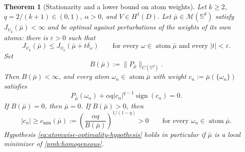 \documentclass[11pt]{amsart}
\newtheorem{theorem}{Theorem}[section]
\theoremstyle{definition}
\theoremstyle{remark}
\DeclareMathOperator{\atom}{atom}
\DeclareMathOperator{\sign}{sign}
\begin{document}
\begin{theorem}[Stationarity and a lower bound on atom weights]
\label{thm:homogeneous_optimality}
Let $k\ge2$, $q=2/(k+1)\in(0,1)$, $\alpha>0$, and $V\in H^1(D)$. Let
$\bar\mu\in\mathcal M(\mathbb S^d)$ satisfy $J_{\psi_k}(\bar\mu)<\infty$ and
be optimal against perturbations of the weights of its own atoms: there is
$\varepsilon>0$ such that
\begin{equation}
\label{eq:atomwise-optimality-hypothesis}
	J_{\psi_k}(\bar\mu)\le J_{\psi_k}(\bar\mu+t\delta_{\omega})
	\qquad\text{for every }\omega\in\atom\bar\mu
	\text{ and every }|t|<\varepsilon.
\end{equation}
Set
\begin{equation*}
	B(\bar\mu):=\|P_{\bar\mu}\|_{C(\mathbb S^d)}.
\end{equation*}
Then $B(\bar\mu)<\infty$, and every atom
$\omega_n\in\atom\bar\mu$ with weight $c_n:=\bar\mu(\{\omega_n\})$ satisfies
\begin{equation}
\label{eq:homogeneous-stationarity}
	P_{\bar\mu}(\omega_n)
	+\alpha q|c_n|^{q-1}\sign(c_n)=0.
\end{equation}
If $B(\bar\mu)=0$, then $\bar\mu=0$. If $B(\bar\mu)>0$, then
\begin{equation}
\label{eq:homogeneous-cmin}
	|c_n|\ge c_{\min}(\bar\mu)
	:=\left(\frac{\alpha q}{B(\bar\mu)}\right)^{1/(1-q)}>0
	\qquad\text{for every }\omega_n\in\atom\bar\mu.
\end{equation}
Hypothesis \eqref{eq:atomwise-optimality-hypothesis} holds in particular if
$\bar\mu$ is a local minimizer of \eqref{prob:homogeneous}.
\end{theorem}
\end{document}
